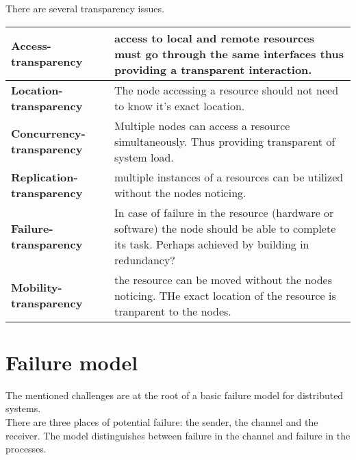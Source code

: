 \begin{enumerate}
There are several transparency issues.
\pagebreak
 \label{tab:title}
\begin{tabular}{L{1.0in} L{3.45in} }    %
\toprule[1.5pt] %
\textbf{Access-\newline transparency} & access to local and remote resources must go through the same  interfaces thus providing a transparent interaction. \\\midrule
\textbf{Location- \newline transparency} & The node accessing a resource should not need to know it's exact location. \\\midrule
\textbf{Concurrency-\newline transparency} & Multiple nodes can access a resource simultaneously. Thus providing transparent of system load.  \\\midrule
\textbf{Replication-\newline transparency} & multiple instances of a resources can be utilized without the nodes noticing.\\\midrule
\textbf{Failure-\newline transparency} & In case of failure in the resource (hardware or software) the node should be able to complete its task. Perhaps achieved by building in redundancy?\\\midrule
\textbf{Mobility-\newline transparency} & the resource can be moved without the nodes noticing. THe exact location of the resource is tranparent to the nodes.\\
\bottomrule[1.25pt] %
\end {tabular}\par
\bigskip


\end{enumerate}


\section{Failure model}

The mentioned challenges are at the root of a basic failure model for distributed systems. \\

There are three places of potential failure: the sender, the channel and the receiver. The model distinguishes between failure in the channel and failure in the processes.


